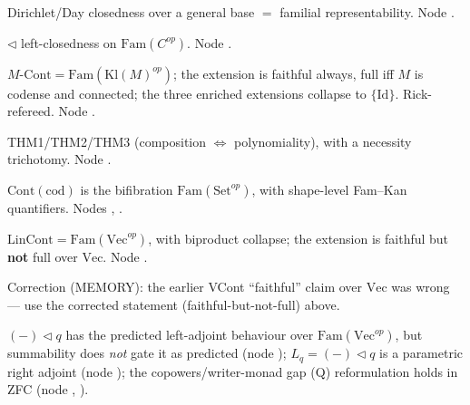 \documentclass[11pt]{article}
\begin{document}
\begin{theorem}
Dirichlet/Day closedness over a general base $=$ familial representability. Node
.
\end{theorem}

\begin{theorem}
$\triangleleft$ left-closedness on $\mathrm{Fam}(C^{op})$. Node .
\end{theorem}

\begin{theorem}
$M\text{-}\mathrm{Cont}=\mathrm{Fam}(\mathrm{Kl}(M)^{op})$; the extension is faithful always, full
iff $M$ is codense and connected; the three enriched extensions collapse to $\{\mathrm{Id}\}$.
Rick-refereed. Node .
\end{theorem}

\begin{theorem}
THM1/THM2/THM3 (composition $\iff$ polynomiality), with a necessity trichotomy. Node
.
\end{theorem}

\begin{proposition}
$\mathrm{Cont}(\mathrm{cod})$ is the bifibration $\mathrm{Fam}(\mathrm{Set}^{op})$, with shape-level
Fam--Kan quantifiers. Nodes , .
\end{proposition}

\begin{proposition}
$\mathrm{LinCont}=\mathrm{Fam}(\mathrm{Vec}^{op})$, with biproduct collapse; the extension is
faithful but \textbf{not} full over $\mathrm{Vec}$. Node .
\end{proposition}
\begin{flag}
Correction (MEMORY): the earlier VCont ``faithful'' claim over $\mathrm{Vec}$ was wrong --- use the
corrected statement (faithful-but-not-full) above.
\end{flag}

\begin{proposition}
$(-)\triangleleft q$ has the predicted left-adjoint behaviour over $\mathrm{Fam}(\mathrm{Vec}^{op})$,
but summability does \emph{not} gate it as predicted (node );
$L_q=(-)\triangleleft q$ is a parametric right adjoint (node ); the
copowers/writer-monad gap (Q) reformulation holds in ZFC (node ,
).
\end{proposition}
\end{document}
